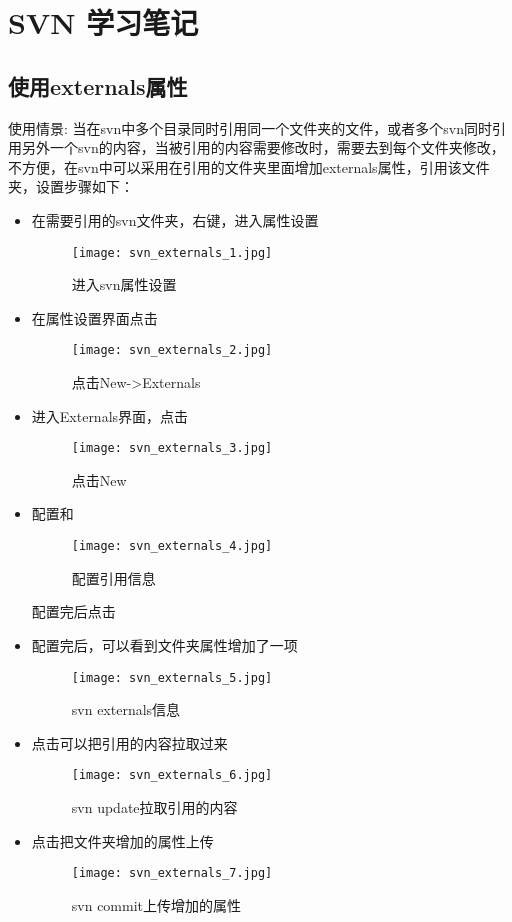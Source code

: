 \section{SVN 学习笔记}
\subsection{使用externals属性}
使用情景: 当在svn中多个目录同时引用同一个文件夹的文件，或者多个svn同时引用另外一个svn的内容，当被引用的内容需要修改时，需要去到每个文件夹修改，不方便，在svn中可以采用在引用的文件夹里面增加externals属性，引用该文件夹，设置步骤如下：
\begin{itemize}
\item 在需要引用的svn文件夹，右键，进入属性设置
\begin{figure}[H]
\centering
\texttt{[image: svn\_externals\_1.jpg]}
\caption{进入svn属性设置}
\end{figure}

\item 在属性设置界面点击
\begin{figure}[H]
\centering
\texttt{[image: svn\_externals\_2.jpg]}
\caption{点击New->Externals}
\end{figure}

\item 进入Externals界面，点击
\begin{figure}[H]
\centering
\texttt{[image: svn\_externals\_3.jpg]}
\caption{点击New}
\end{figure}

\item 配置和
\begin{figure}[H]
\centering
\texttt{[image: svn\_externals\_4.jpg]}
\caption{配置引用信息}
\end{figure}
配置完后点击

\item 配置完后，可以看到文件夹属性增加了一项
\begin{figure}[H]
\centering
\texttt{[image: svn\_externals\_5.jpg]}
\caption{svn externals信息}
\end{figure}


\item 点击可以把引用的内容拉取过来
\begin{figure}[H]
\centering
\texttt{[image: svn\_externals\_6.jpg]}
\caption{svn update拉取引用的内容}
\end{figure}

\item 点击把文件夹增加的属性上传
\begin{figure}[H]
\centering
\texttt{[image: svn\_externals\_7.jpg]}
\caption{svn commit上传增加的属性}
\end{figure}

\end{itemize}

